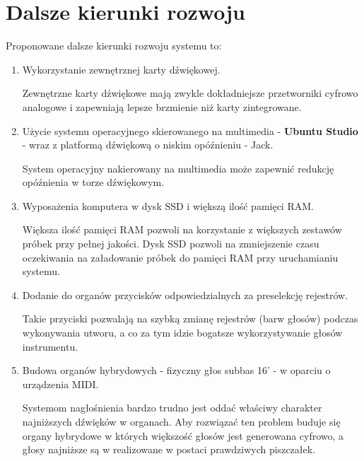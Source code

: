 \documentclass[11pt]{report}
\begin{document}
    \section{Dalsze kierunki rozwoju}\label{sec:dalsze-kierunki-rozwoju}
    Proponowane dalsze kierunki rozwoju systemu to:
    \begin{enumerate}
        \item Wykorzystanie zewnętrznej karty dźwiękowej.

        Zewnętrzne karty dźwiękowe mają zwykle dokładniejsze przetworniki cyfrowo analogowe i zapewniają lepsze brzmienie niż karty zintegrowane.
        \item Użycie systemu operacyjnego skierowanego na multimedia - \textbf{Ubuntu Studio} - wraz z platformą dźwiękową o niskim opóźnieniu - Jack.

        System operacyjny nakierowany na multimedia może zapewnić redukcję opóźnienia w torze dźwiękowym.
        \item Wyposażenia komputera w dysk SSD i większą ilość pamięci RAM.

        Większa ilość pamięci RAM pozwoli na korzystanie z większych zestawów próbek przy pełnej jakości.
        Dysk SSD pozwoli na zmniejszenie czasu oczekiwania na załadowanie próbek do pamięci RAM przy uruchamianiu systemu.
        \item Dodanie do organów przycisków odpowiedzialnych za preselekcję rejestrów.

        Takie przyciski pozwalają na szybką zmianę rejestrów (barw głosów) podczas wykonywania utworu, a co za tym idzie bogatsze wykorzystywanie głosów instrumentu.
        \item Budowa organów hybrydowych - fizyczny głos subbas 16' - w oparciu o urządzenia MIDI.

        Systemom nagłośnienia bardzo trudno jest oddać właściwy charakter najniższych dźwięków w organach.
        Aby rozwiązać ten problem buduje się organy hybrydowe w których większość głosów jest generowana cyfrowo, a głosy najniższe są w realizowane w postaci prawdziwych piszczałek.
    \end{enumerate}


    \newpage

    \printbibliography[title={Bibliografia}]
\end{document}
